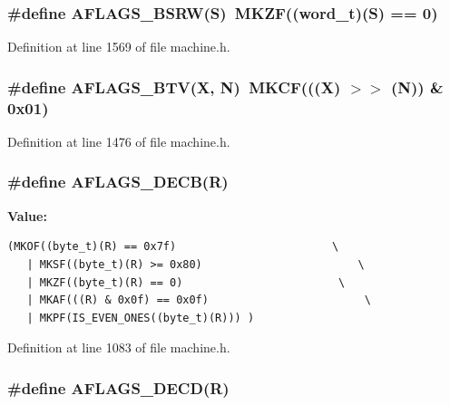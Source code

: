 \subsubsection[{AFLAGS\_\-BSRW}]{\setlength{\rightskip}{0pt plus 5cm}\#define AFLAGS\_\-BSRW(S)~MKZF(({\bf word\_\-t})(S) == 0)}\label{machine_8h_f5b62cd0290435a01f5f06cb0bf9d914}




Definition at line 1569 of file machine.h.
\subsubsection[{AFLAGS\_\-BTV}]{\setlength{\rightskip}{0pt plus 5cm}\#define AFLAGS\_\-BTV(X, \/  N)~MKCF(((X) $>$$>$ (N)) \& 0x01)}\label{machine_8h_24e2f40d5737b1bf4a37d44298598309}




Definition at line 1476 of file machine.h.
\subsubsection[{AFLAGS\_\-DECB}]{\setlength{\rightskip}{0pt plus 5cm}\#define AFLAGS\_\-DECB(R)}\label{machine_8h_566e70c3485f55f41bd8cd6d3491d0f1}


\textbf{Value:}

\begin{Code}\begin{verbatim}(MKOF((byte_t)(R) == 0x7f)                        \
   | MKSF((byte_t)(R) >= 0x80)                        \
   | MKZF((byte_t)(R) == 0)                        \
   | MKAF(((R) & 0x0f) == 0x0f)                        \
   | MKPF(IS_EVEN_ONES((byte_t)(R))) )
\end{verbatim}
\end{Code}


Definition at line 1083 of file machine.h.
\subsubsection[{AFLAGS\_\-DECD}]{\setlength{\rightskip}{0pt plus 5cm}\#define AFLAGS\_\-DECD(R)}\label{machine_8h_ae47aec8959f806804bcd2aa5d56f2c8}


